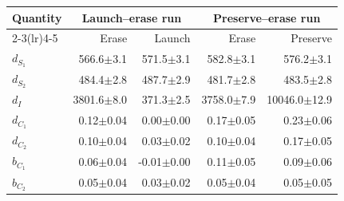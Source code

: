 \begingroup
\setlength{\tabcolsep}{3pt}
\begin{tabular}{@{}lrrrr@{}}
\toprule
Quantity & \multicolumn{2}{c}{Launch--erase run} & \multicolumn{2}{c}{Preserve--erase run} \\
\cmidrule(lr){2-3}\cmidrule(lr){4-5}
 & Erase & Launch & Erase & Preserve \\
\midrule
$d_{S_1}$ & 566.6\ensuremath{\pm}3.1 & 571.5\ensuremath{\pm}3.1 & 582.8\ensuremath{\pm}3.1 & 576.2\ensuremath{\pm}3.1 \\
$d_{S_2}$ & 484.4\ensuremath{\pm}2.8 & 487.7\ensuremath{\pm}2.9 & 481.7\ensuremath{\pm}2.8 & 483.5\ensuremath{\pm}2.8 \\
$d_I$ & 3801.6\ensuremath{\pm}8.0 & 371.3\ensuremath{\pm}2.5 & 3758.0\ensuremath{\pm}7.9 & 10046.0\ensuremath{\pm}12.9 \\
$d_{C_1}$ & 0.12\ensuremath{\pm}0.04 & 0.00\ensuremath{\pm}0.00 & 0.17\ensuremath{\pm}0.05 & 0.23\ensuremath{\pm}0.06 \\
$d_{C_2}$ & 0.10\ensuremath{\pm}0.04 & 0.03\ensuremath{\pm}0.02 & 0.10\ensuremath{\pm}0.04 & 0.17\ensuremath{\pm}0.05 \\
$b_{C_1}$ & 0.06\ensuremath{\pm}0.04 & -0.01\ensuremath{\pm}0.00 & 0.11\ensuremath{\pm}0.05 & 0.09\ensuremath{\pm}0.06 \\
$b_{C_2}$ & 0.05\ensuremath{\pm}0.04 & 0.03\ensuremath{\pm}0.02 & 0.05\ensuremath{\pm}0.04 & 0.05\ensuremath{\pm}0.05 \\
\bottomrule
\end{tabular}
\endgroup
